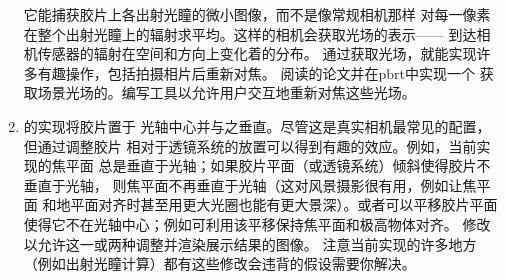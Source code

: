 \begin{enumerate}
      它能捕获胶片上各出射光瞳的微小图像，而不是像常规相机那样
      对每一像素在整个出射光瞳上的辐射求平均。这样的相机会获取光场的表示——
      到达相机传感器的辐射在空间和方向上变化着的分布。
      通过获取光场，就能实现许多有趣操作，包括拍摄相片后重新对焦。
      阅读\citeauthor{ng:hal-02551481}的论文并在pbrt中实现一个
      获取场景光场的。编写工具以允许用户交互地重新对焦这些光场。
      \item \circlethree {}的实现将胶片置于
      光轴中心并与之垂直。尽管这是真实相机最常见的配置，但通过调整胶片
      相对于透镜系统的放置可以得到有趣的效应。例如，当前实现的焦平面
      总是垂直于光轴；如果胶片平面（或透镜系统）倾斜使得胶片不垂直于光轴，
      则焦平面不再垂直于光轴（这对风景摄影很有用，例如让焦平面
      和地平面对齐时甚至用更大光圈也能有更大景深）。或者可以平移胶片平面
      使得它不在光轴中心；例如可利用该平移保持焦平面和极高物体对齐。
      修改以允许这一或两种调整并渲染展示结果的图像。
      注意当前实现的许多地方（例如出射光瞳计算）都有这些修改会违背的假设需要你解决。
\end{enumerate}